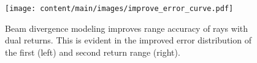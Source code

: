 \begin{figure}[t]
    \centering
        \texttt{[image: content/main/images/improve\_error\_curve.pdf]}
        \caption{Beam divergence modeling improves range accuracy of rays with dual returns. This is evident in the improved error distribution of the first (left) and second return range (right).}
    \label{fig:ecdf}
\end{figure}